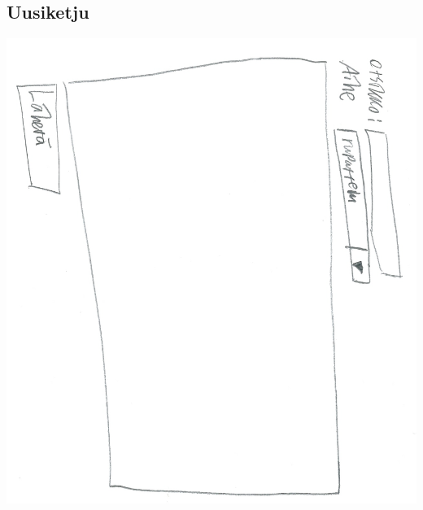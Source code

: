 \documentclass[a4paper, 12pt, finnish]{article}
\begin{document}
\subsection{Uusiketju}
\includegraphics[width=\textwidth,height=\textheight,keepaspectratio]{uusiketju.png}
\end{document}
